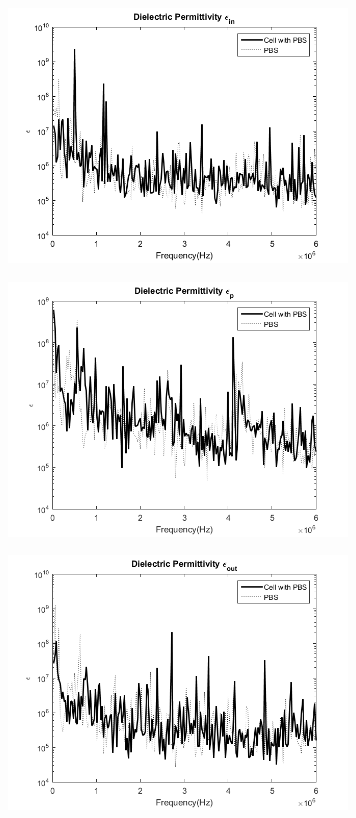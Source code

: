 \documentclass[journal]{IEEEtran}
\begin{document}
\begin{figure}[ht]
\label{diectric_Permittivity_in}
\includegraphics[width = 9cm]{Epsilon_In.png}
\end{figure}

\begin{figure}[ht]
\label{diectric_Permittivity_P}
\includegraphics[width = 9cm]{Epsilon_P.png}
\end{figure}

\begin{figure}[ht]
\label{diectric_Permittivity_Out}
\includegraphics[width = 9cm]{Epsilon_Out.png}
\end{figure}
\end{document}
